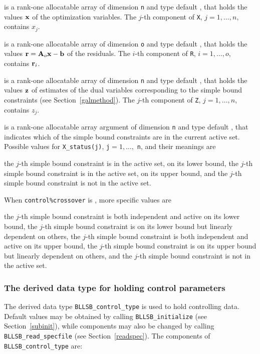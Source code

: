 \documentclass{galahad}
\newcommand{\packagename}{BLLSB}
\begin{document}
\begin{description}
 is a rank-one allocatable array of dimension {\tt n} and type
default \realdp,
that holds the values ${\mathbf{x}}$ of the optimization variables.
The $j$-th component of {\tt X}, $j = 1,  \ldots , n$, contains $x_{j}$.

 is a rank-one allocatable array of dimension {\tt o} and type default
\realdp, that holds the values ${\mathbf{r}} = {\mathbf{A}}_o {\mathbf{x}} - {\mathbf{b}}$ of the residuals.
The $i$-th component of {\tt R}, $i = 1,  \ldots , o$, contains ${\mathbf{r}}_{i}$.

 is a rank-one allocatable array of dimension {\tt n} and type default
\realdp, that holds
the values ${\mathbf{z}}$ of estimates  of the dual variables
corresponding to the simple bound constraints (see Section~\ref{galmethod}).
The $j$-th component of {\tt Z}, $j = 1,  \ldots ,  n$, contains $z_{j}$.

 is a rank-one allocatable array argument of dimension {\tt n}
and type default \integer, that indicates which of the simple bound
constraints are in the current active set. Possible values for
{\tt X\_status(j)}, {\tt j}$=1, \ldots ,$ {\tt n}, and their meanings are
\begin{description}
 the $j$-th simple bound constraint
is in the active set, on its lower bound,
 the $j$-th simple bound constraint
is in the active set, on its upper bound, and
  the $j$-th simple bound constraint is not in the active set.
\end{description}
When {\tt control\%crossover} is \true, more specific values are
\begin{description}
 the $j$-th simple bound constraint
is both independent and active on its lower bound,
 the $j$-th simple bound constraint
is on its lower bound but linearly dependent on others,
 the $j$-th simple bound constraint
is both independent and active on its upper bound,
 the $j$-th simple bound constraint
is on its upper bound but linearly dependent on others, and
 the $j$-th simple bound constraint is not in the active set.
\end{description}

\end{description}


\subsubsection{The derived data type for holding control
 parameters}\label{typecontrol}
The derived data type
{\tt \packagename\_control\_type}
is used to hold controlling data. Default values may be obtained by calling
{\tt \packagename\_initialize}
(see Section~\ref{subinit}),
while components may also be changed by calling
{\tt \packagename\_read\-\_specfile}
(see Section~\ref{readspec}).
The components of
{\tt \packagename\_control\_type}
are:
\end{document}
